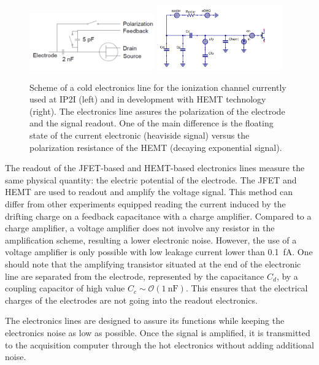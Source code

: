 \begin{figure}
\centering
\includegraphics[width=0.48\textwidth]{Figures/Electrodes/electronic_ion_ip2i.png}
\includegraphics[width=0.48\textwidth]{Figures/Electrodes/electronic_ion_hemt.png}
\caption{Scheme of a cold electronics line for the ionization channel currently used at IP2I (left) and in development with HEMT technology (right). The electronics line assures the polarization of the electrode and the signal readout. One of the main difference is the floating state of the current electronic (heaviside signal) versus the polarization resistance of the HEMT (decaying exponential signal).}
\label{fig:electronics-scheme}
\end{figure}

The readout of the JFET-based and HEMT-based electronics lines measure the same physical quantity: the electric potential of the electrode. The JFET and HEMT are used to readout and amplify the voltage signal. This method can differ from other experiments equipped reading the current induced by the drifting charge on a feedback capacitance with a charge amplifier. Compared to a charge amplifier, a voltage amplifier does not involve any resistor in the amplification scheme, resulting a lower electronic noise. However, the use of a voltage amplifier is only possible with low leakage current lower than \SI{0.1}{\femto\ampere}.
One should note that the amplifying transistor situated at the end of the electronic line are separated from the electrode, represented by the capacitance $C_d$, by a coupling capacitor of high value $C_c \sim \mathcal{O}(\SI{1}{\nano\farad})$. This ensures that the electrical charges of the electrodes are not going into the readout electronics.

The electronics lines are designed to assure its functions while keeping the electronics noise as low as possible. Once the signal is amplified, it is transmitted to the acquisition computer through the hot electronics without adding additional noise.

